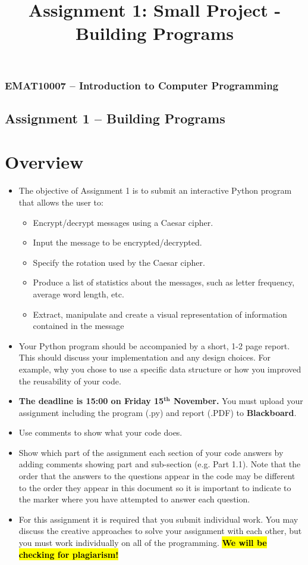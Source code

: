 \documentclass[11pt]{report}
\begin{document}
\title{Assignment 1: Small Project - Building Programs}
\subsubsection*{EMAT10007 -- Introduction to Computer Programming}
\subsection*{\Large Assignment 1 -- Building Programs}

\section*{Overview}
\begin{itemize}
	\item The objective of Assignment 1 is to submit an interactive Python program that allows the user to:
	\begin{itemize}
		\item Encrypt/decrypt messages using a Caesar cipher.
		\item Input the message to be encrypted/decrypted.
		\item Specify the rotation used by the Caesar cipher.
		\item Produce a list of statistics about the messages, such as letter frequency, average word length, etc.
		\item Extract, manipulate and create a visual representation of information contained in the message 
	\end{itemize}
	\item Your Python program should be accompanied by a short, 1-2 page report. This should discuss your implementation and any design choices. For example, why you chose to use a specific data structure or how you improved the reusability of your code. 
 	\item \textbf{The \textbf{deadline is 15:00 on Friday 15$^{\textbf{th}}$ November.}} You must upload your assignment including the program (.py) and report (.PDF) to \textbf{Blackboard}.
	\item Use comments to show what your code does. 
	\item Show which part of the assignment each section of your code answers by adding comments showing part and sub-section (e.g. Part 1.1). Note that the order that the answers to the questions appear in the code may be different to the order they appear in this document so it is important to indicate to the marker where you have attempted to answer each question. 
	\item For this assignment it is required that you submit individual work. You may discuss the creative approaches to solve your assignment with each other, but you must work individually on all of the programming.
	\textbf{\hl{We will be checking for plagiarism!}}
\end{itemize}
\end{document}
